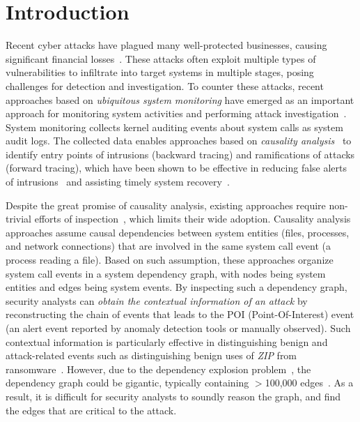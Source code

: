 \section{Introduction}
\label{sec:intro}


Recent cyber attacks have plagued many well-protected businesses, causing significant 
financial losses~\cite{ebay,opm,target,homedepot,ya:yahooleak,equifax,marriott}.
These attacks often exploit multiple types of vulnerabilities to infiltrate into target systems in multiple stages, posing challenges for detection and investigation.
To counter these attacks, recent approaches based on \emph{ubiquitous system monitoring} have emerged as an important approach for monitoring system activities and performing attack investigation~\cite{backtracking,backtracking2,wormlog,logtracking,mcitracking,liu2018priotracker,gao2018aiql,gao2018saql}.
System monitoring collects kernel auditing events about system calls as system audit logs.
The collected data enables approaches based on \textit{causality analysis}~\cite{backtracking,backtracking2,taser,intrusionrecovery,liu2018priotracker,mcitracking,hassan2019nodoze,ma2016protracer} to identify entry points of intrusions (backward tracing) and ramifications of attacks (forward tracing), 
which have been shown to be effective in reducing false alerts of intrusions~\cite{alertfp,alertfp2,hassan2019nodoze} and assisting timely system recovery~\cite{taser,intrusionrecovery}.

Despite the great promise of causality analysis, 
existing approaches require non-trivial efforts of inspection~\cite{auditcluster,hassan2019nodoze}, which limits their wide adoption.
Causality analysis approaches assume causal dependencies between system entities (\eg files, processes, and network connections) that are involved in the same system call event (\eg a process reading a file).
Based on such assumption, these approaches organize system call events in a system dependency graph, with nodes being system entities and edges being system events. 
By inspecting such a dependency graph, security analysts can \textit{obtain the contextual information of an attack} by reconstructing the chain of events that leads to the POI (Point-Of-Interest) event (\ie an alert event reported by anomaly detection tools or manually observed).
Such contextual information is particularly effective in distinguishing benign and attack-related events such as distinguishing benign uses of \textit{ZIP} from ransomware~\cite{hassan2019nodoze,ransomware}.
However, due to the dependency explosion problem~\cite{beep,reduction,reduction2}, the dependency graph could be gigantic, typically containing $>$100,000 edges~\cite{hassan2019nodoze,auditcluster}. 
As a result, it is difficult for security analysts to soundly reason the graph, and find the edges that are critical to the attack.


